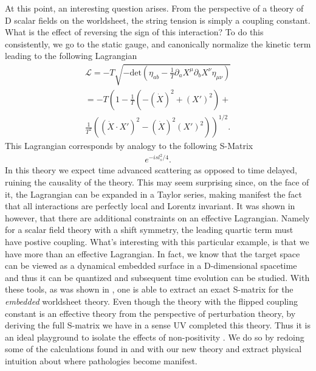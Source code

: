 \documentclass[%
 reprint,
 amsmath,amssymb,
 aps,
]{revtex4-1}
\begin{document}
At this point, an interesting question arises. From the perspective of a theory of D scalar fields on the
worldsheet, the string tension is simply a coupling constant.  What is the effect of reversing the
sign of this interaction?  To do this consistently, we go to the static gauge, and canonically
normalize the kinetic term leading to the following Lagrangian
\begin{eqnarray}
\label{action}
\mathcal{L} = -T \sqrt{ - \mathrm{det} (\eta_{a b} - \frac{1}{T} \partial_a X^{\mu}
    \partial_b X^{\nu} \eta_{\mu \nu})} \nonumber \\
 = -T \left( 1 - \frac{1}{T}
     (-(\dot{X})^2 + (X')^2) + \right. \nonumber \\
     \left. \frac{1}{T^2} ((\dot{X} \cdot X')^2 -
     (\dot{X})^2 (X')^2) \right)^{1/2} .
\end{eqnarray}
This Lagrangian corresponds by analogy to the following S-Matrix
\begin{eqnarray}
    e^{-i s l_s^2 /4} . \nonumber
\end{eqnarray}
In this theory we expect time advanced scattering as opposed to time delayed, ruining the causality
of the theory.  This may seem surprising since, on the face of it, the Lagrangian can be expanded in a
Taylor series, making manifest the fact that all interactions are perfectly local and Lorentz invariant.  It was shown
in \cite{Adams:2006sv} however, that there are additional constraints on an effective Lagrangian.
Namely for a scalar field theory with a shift symmetry, the leading quartic term must have postive
coupling. What's interesting with this particular example, is that we have more than an effective
Lagrangian.  In fact, we know that the target space can be viewed as a dynamical embedded surface in
a D-dimensional spacetime and thus it can be quantized and subsequent time evolution can be studied.
With these tools, as was shown in \cite{Dubovsky:2012wk}, one is able to extract an exact S-matrix
for the \emph{embedded} worldsheet theory. Even though the theory with the flipped coupling constant is an
effective theory from the perspective of perturbation theory, by deriving the full S-matrix we have
in a sense UV completed this theory. Thus it is an ideal playground to isolate the effects of
non-positivity \cite{Adams:2006sv}.  We do so by redoing some of the calculations found in
\cite{Dubovsky:2012wk} and \cite{Adams:2006sv} with our new theory and extract physical intuition
about where pathologies become manifest.

\end{document}
